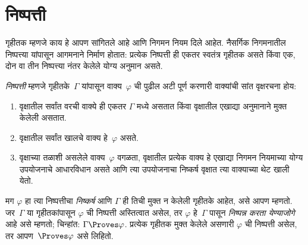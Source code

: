 \section{निष्पत्ती}\label{fol:ntd:der:sec}
\begin{explain}
गृहीतक म्हणजे काय हे आपण सांगितले आहे आणि निगमन नियम दिले आहेत.
नैसर्गिक निगमनातील निष्पत्त्या यांपासून आगमनाने निर्माण होतात:
प्रत्येक निष्पत्ती ही एकतर स्वतंत्र गृहीतक असते किंवा एक, दोन वा तीन
निष्पत्त्या नंतर केलेले योग्य अनुमान असते.
\end{explain}
\begin{defn}[निष्पत्ती]
\emph{निष्पत्ती} म्हणजे गृहीतके~$\Gamma$
यांपासून वाक्य~$\varphi$ ची पुढील अटी पूर्ण करणारी वाक्यांची
सांत वृक्षरचना होय:
\begin{enumerate}
\item वृक्षातील सर्वांत वरची वाक्ये ही एकतर $\Gamma$ मध्ये असतात
  किंवा वृक्षातील एखाद्या अनुमानाने मुक्त केलेली असतात.
\item वृक्षातील सर्वांत खालचे वाक्य हे~$\varphi$ असते.
\item वृक्षाच्या तळाशी असलेले वाक्य~$\varphi$ वगळता, वृक्षातील प्रत्येक
  वाक्य हे एखाद्या निगमन नियमाच्या योग्य उपयोजनाचे आधारविधान असते
  आणि त्या उपयोजनाचा निष्कर्ष वृक्षात त्या वाक्याच्या थेट खाली येतो.
\end{enumerate}
मग $\varphi$ हा त्या निष्पत्तीचा \emph{निष्कर्ष} आणि $\Gamma$ ही तिची
मुक्त न केलेली गृहीतके आहेत, असे आपण म्हणतो.
जर~$\Gamma$ या गृहीतकांपासून $\varphi$ ची निष्पत्ती अस्तित्वात असेल, तर
$\varphi$ हे~$\Gamma$ पासून \emph{निष्पन्न करता येण्याजोगे} आहे असे म्हणतो; चिन्हांत:
$\Gamma \Proves \varphi$. प्रत्येक गृहीतक मुक्त केलेले असणारी $\varphi$
ची निष्पत्ती असेल, तर आपण~$\Proves \varphi$ असे लिहितो.
\end{defn}
